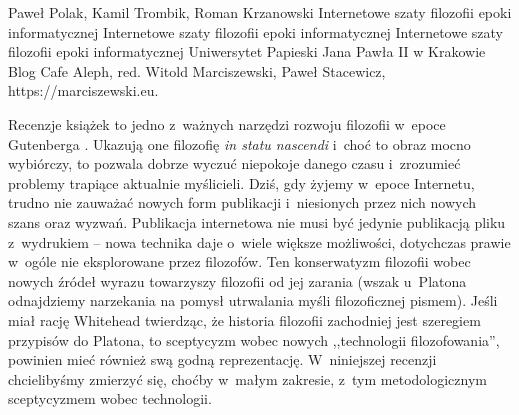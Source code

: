 \begin{newrevplenv}{Paweł Polak, Kamil Trombik, Roman Krzanowski}
	{Internetowe szaty filozofii epoki informatycznej}
	{Internetowe szaty filozofii epoki informatycznej}
	{Internetowe szaty filozofii epoki informatycznej}
	{Uniwersytet Papieski Jana Pawła II w Krakowie}
	{Blog Cafe Aleph, red. Witold Marciszewski, Paweł Stacewicz, https://marciszewski.eu.}

\lettrine[loversize=0.13,lines=2,lraise=-0.03,nindent=0em,findent=0.2pt]%
{R}{}ecenzje książek to jedno z~ważnych narzędzi rozwoju filozofii w~epoce Gutenberga
\parencite[więcej na temat historycznej roli recenzji zob.][]{pleshkov_book_2021}. %
Ukazują one filozofię \textit{in statu nascendi} i~choć to obraz mocno wybiórczy, to pozwala dobrze wyczuć niepokoje danego czasu i~zrozumieć problemy trapiące aktualnie myślicieli. Dziś, gdy żyjemy w~epoce Internetu, trudno nie zauważać nowych form publikacji i~niesionych przez nich nowych szans oraz wyzwań. Publikacja internetowa nie musi być jedynie publikacją pliku z~wydrukiem -- nowa technika daje o~wiele większe możliwości, dotychczas prawie w~ogóle nie eksplorowane przez filozofów. Ten konserwatyzm filozofii wobec nowych źródeł wyrazu towarzyszy filozofii od jej zarania (wszak u~Platona odnajdziemy narzekania na pomysł utrwalania myśli filozoficznej pismem). Jeśli miał rację Whitehead twierdząc, że historia filozofii zachodniej jest szeregiem przypisów do Platona, to sceptycyzm wobec nowych ,,technologii filozofowania'', powinien mieć również swą godną reprezentację. W~niniejszej recenzji chcielibyśmy zmierzyć się, choćby w~małym zakresie, z~tym metodologicznym sceptycyzmem wobec technologii.


\end{newrevplenv}

